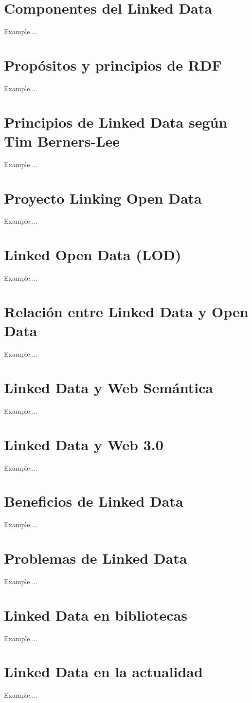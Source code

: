 \documentclass[11pt]{report}
\begin{document}
	\chapter{Componentes del Linked Data}
	Example....
	
	
	\chapter{Propósitos y principios de RDF}
  Example....	

	\chapter{Principios de Linked Data según Tim Berners-Lee}
	Example....

	\chapter{Proyecto Linking Open Data}
	Example....

	\chapter{Linked Open Data (LOD)}
	Example....

	\chapter{Relación entre Linked Data y Open Data}
	Example....

	\chapter{Linked Data y Web Semántica}
	Example....

	\chapter{Linked Data y Web 3.0}
	Example....

	\chapter{Beneficios de Linked Data}
	Example....

	\chapter{Problemas de Linked Data}
	Example....

	\chapter{Linked Data en bibliotecas}
	Example....

	\chapter{Linked Data en la actualidad}
	Example....

	
\end{document}
